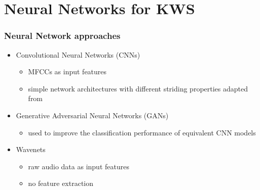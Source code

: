 
\section{Neural Networks for KWS}

\begin{frame}
  \frametitle{Neural Network approaches}
  \begin{itemize}
    \item Convolutional Neural Networks (CNNs)
    \begin{itemize}
      \item MFCCs as input features
      \item simple network architectures with different striding properties adapted from \cite{Sainath2015}
    \end{itemize}
    \item Generative Adversarial Neural Networks (GANs) \cite{Goodfellow2014}
    \begin{itemize}
      \item used to improve the classification performance of equivalent CNN models
    \end{itemize}
    \item Wavenets \cite{Oord2016}
    \begin{itemize}
      \item raw audio data as input features
      \item no feature extraction
    \end{itemize}
  \end{itemize}
\end{frame}

